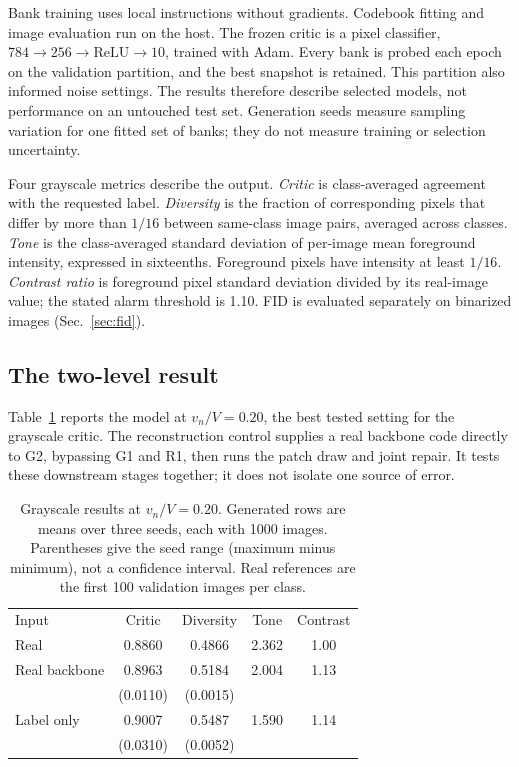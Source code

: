 \documentclass[reprint,amsmath,amssymb,aps,pra,floatfix,nofootinbib]{revtex4-2}
\begin{document}
Bank training uses local instructions without gradients. Codebook fitting and image evaluation run on the host. The frozen critic is a pixel classifier, $784\to256\to\mathrm{ReLU}\to10$, trained with Adam. Every bank is probed each epoch on the validation partition, and the best snapshot is retained. This partition also informed noise settings. The results therefore describe selected models, not performance on an untouched test set. Generation seeds measure sampling variation for one fitted set of banks; they do not measure training or selection uncertainty.

Four grayscale metrics describe the output. \emph{Critic} is class-averaged agreement with the requested label. \emph{Diversity} is the fraction of corresponding pixels that differ by more than $1/16$ between same-class image pairs, averaged across classes. \emph{Tone} is the class-averaged standard deviation of per-image mean foreground intensity, expressed in sixteenths. Foreground pixels have intensity at least $1/16$. \emph{Contrast ratio} is foreground pixel standard deviation divided by its real-image value; the stated alarm threshold is 1.10. FID is evaluated separately on binarized images (Sec.~\ref{sec:fid}).

\subsection{The two-level result}
Table~\ref{tab:quality} reports the model at $v_n/V=0.20$, the best tested setting for the grayscale critic. The reconstruction control supplies a real backbone code directly to G2, bypassing G1 and R1, then runs the patch draw and joint repair. It tests these downstream stages together; it does not isolate one source of error.

\begin{table}[tbp]
\caption{Grayscale results at $v_n/V=0.20$. Generated rows are means over three seeds, each with 1000 images. Parentheses give the seed range (maximum minus minimum), not a confidence interval. Real references are the first 100 validation images per class.}
\label{tab:quality}
\begin{ruledtabular}
\footnotesize
\begin{tabular}{lcccc}
Input & Critic & Diversity & Tone & Contrast\\
\colrule
Real & 0.8860 & 0.4866 & 2.362 & 1.00\\
Real backbone & 0.8963 & 0.5184 & 2.004 & 1.13\\
 & (0.0110) & (0.0015) & &\\
Label only & 0.9007 & 0.5487 & 1.590 & 1.14\\
 & (0.0310) & (0.0052) & &\\
\end{tabular}
\end{ruledtabular}
\end{table}
\end{document}
